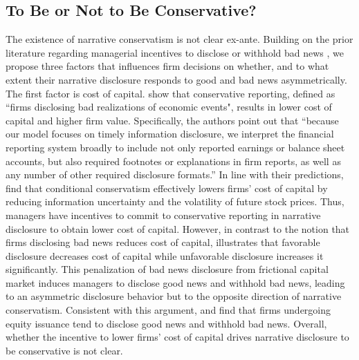 \documentclass[letterpaper,11pt]{article}
\begin{document}
\begin{spacing}{1.5}
\subsection{To Be or Not to Be Conservative?} \label{sec2.3}
The existence of narrative conservatism is not clear ex-ante. Building on the prior literature regarding managerial incentives to disclose or withhold bad news \cite{kasznikWarnNotWarn1995, kothariManagersWithholdBad2009, baoManagersDiscloseWithhold2019}, we propose three factors that influences firm decisions on whether, and to what extent their narrative disclosure responds to good and bad news asymmetrically. The first factor is cost of capital.  show that conservative reporting, defined as ``firms disclosing bad realizations of economic events", results in lower cost of capital and higher firm value. Specifically, the authors point out that ``because our model focuses on timely information disclosure, we interpret the financial reporting system broadly to include not only reported earnings or balance sheet accounts, but also required footnotes or explanations in firm reports, as well as any number of other required disclosure formats.'' \cite[p. 73]{guayConservativeDisclosure2018} In line with their predictions,  find that conditional conservatism effectively lowers firms' cost of capital by reducing information uncertainty and the volatility of future stock prices. Thus, managers have incentives to commit to conservative reporting in narrative disclosure to obtain lower cost of capital. However, in contrast to the notion that firms disclosing bad news reduces cost of capital,  illustrates that favorable disclosure decreases cost of capital while unfavorable disclosure increases it significantly. This penalization of bad news disclosure from frictional capital market induces managers to disclose good news and withhold bad news, leading to an asymmetric disclosure behavior but to the opposite direction of narrative conservatism. Consistent with this argument,  and  find that firms undergoing equity issuance tend to disclose good news and withhold bad news. Overall, whether the incentive to lower firms' cost of capital drives narrative disclosure to be conservative is not clear.


\end{spacing}
\end{document}
